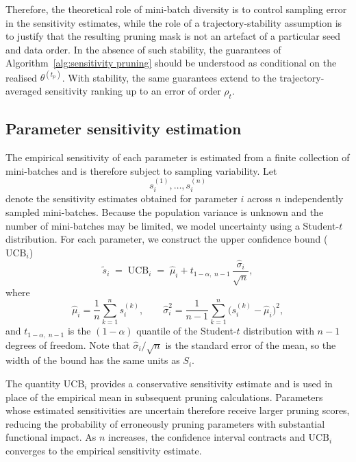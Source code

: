 \documentclass{article}
\theoremstyle{definition}
\theoremstyle{remark}
\begin{document}
Therefore, the theoretical role of mini-batch diversity is to control sampling
error in the sensitivity estimates, while the role of a trajectory-stability
assumption is to justify that the resulting pruning mask is not an artefact of a
particular seed and data order. In the absence of such stability, the guarantees
of Algorithm~\ref{alg:sensitivity pruning} should be understood as conditional on
the realised $\theta^{(t_p)}$. With stability, the same guarantees extend to the
trajectory-averaged sensitivity ranking up to an error of order $\rho_t$.





\subsection{Parameter sensitivity estimation}

The empirical sensitivity of each parameter is estimated from a finite collection of mini-batches and is therefore subject to sampling variability. Let
\[
s_i^{(1)},\ldots,s_i^{(n)}
\]
denote the sensitivity estimates obtained for parameter $i$ across $n$ independently sampled mini-batches. Because the population variance is unknown and the number of mini-batches may be limited, we model uncertainty using a Student-$t$ distribution. For each parameter, we construct the upper confidence bound ($\mathrm{UCB}_i$)
\[
\tilde{s}_i
\;=\;
\mathrm{UCB}_i
\;=\;
\hat{\mu}_i
+
t_{1-\alpha,\;n-1}\,
\frac{\hat{\sigma}_i}{\sqrt{n}},
\]
where
\[
\hat{\mu}_i=\frac1n\sum_{k=1}^n s_i^{(k)},
\qquad
\hat{\sigma}_i^2=\frac{1}{n-1}\sum_{k=1}^n\bigl(s_i^{(k)}-\hat{\mu}_i\bigr)^2,
\]
and $t_{1-\alpha,\;n-1}$ is the $(1-\alpha)$ quantile of the Student-$t$ distribution with $n-1$ degrees of freedom. Note that $\hat{\sigma}_i/\sqrt{n}$ is the standard error of the mean, so the width of the bound has the same units as $S_i$.

The quantity $\mathrm{UCB}_i$ provides a conservative sensitivity estimate and is used in place of the empirical mean in subsequent pruning calculations. Parameters whose estimated sensitivities are uncertain therefore receive larger pruning scores, reducing the probability of erroneously pruning parameters with substantial functional impact. As $n$ increases, the confidence interval contracts and $\mathrm{UCB}_i$ converges to the empirical sensitivity estimate.
\end{document}
